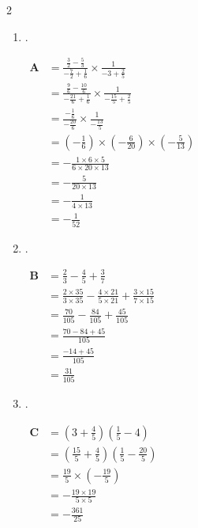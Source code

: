 \documentclass[12pt,a4paper]{article}
\begin{document}
\begin{multicols}{2}
\setlength{\columnseprule}{0.1mm}
\begin{enumerate}
\item .

$\begin{aligned}
            \textbf{A} &= \frac{\frac{3}{2}-\frac{5}{3}}{-\frac{7}{2}+\frac{1}{6}} \times \frac{1}{-3+\frac{2}{5}} \\[0.8em]
            &= \frac{\frac{9}{6}-\frac{10}{6}}{-\frac{21}{6}+\frac{1}{6}} \times \frac{1}{-\frac{15}{5}+\frac{2}{5}} \\[0.8em]
            &= \frac{-\frac{1}{6}}{-\frac{20}{6}} \times \frac{1}{-\frac{13}{5}} \\[0.8em]
            &= \left(-\frac{1}{6}\right) \times \left(-\frac{6}{20}\right) \times \left(-\frac{5}{13}\right) \\[0.5em]
            &= -\frac{1 \times 6 \times 5}{6 \times 20 \times 13} \\[0.5em]
            &= -\frac{5}{20 \times 13} \\[0.5em]
            &= -\frac{1}{4 \times 13} \\[0.5em]
            &= -\frac{1}{52}
        \end{aligned}$
        
\item .

$\begin{aligned}
            \textbf{B} &= \frac{2}{3}-\frac{4}{5}+\frac{3}{7} \\[0.5em]
            &= \frac{2 \times 35}{3 \times 35} - \frac{4 \times 21}{5 \times 21} + \frac{3 \times 15}{7 \times 15} \\[0.5em]
            &= \frac{70}{105} - \frac{84}{105} + \frac{45}{105} \\[0.5em]
            &= \frac{70 - 84 + 45}{105} \\[0.5em]
            &= \frac{-14 + 45}{105} \\[0.5em]
            &= \frac{31}{105}
        \end{aligned}$

\item .

$\begin{aligned}
            \textbf{C} &= \left(3+\frac{4}{5}\right) \left(\frac{1}{5}-4\right) \\[0.5em]
            &= \left(\frac{15}{5}+\frac{4}{5}\right) \left(\frac{1}{5}-\frac{20}{5}\right) \\[0.5em]
            &= \frac{19}{5} \times \left(-\frac{19}{5}\right) \\[0.5em]
            &= -\frac{19 \times 19}{5 \times 5} \\[0.5em]
            &= -\frac{361}{25}
        \end{aligned}$


\end{enumerate}
\end{multicols}
\end{document}
